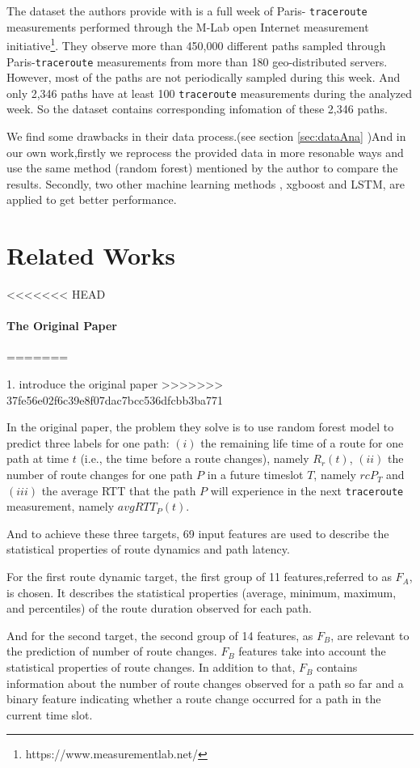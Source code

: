 \documentclass[sigconf]{acmart}
\begin{document}
The dataset the authors provide with is a full week of Paris- \texttt{traceroute} measurements performed through the M-Lab open
Internet measurement initiative\footnote{https://www.measurementlab.net/}. They observe more than 450,000 different paths sampled through Paris-\texttt{traceroute} measurements from more than 180 geo-distributed servers. However, most of the paths are not periodically sampled during this week. And only 2,346 paths have at least 100 \texttt{traceroute} measurements during the analyzed week. So the dataset contains corresponding infomation of these 2,346 paths.

We find some drawbacks in their data process.(see section \ref{sec:dataAna} )And in our own work,firstly we reprocess the provided data in more resonable ways and use the same method (random forest) mentioned by the author to compare the results. Secondly, two other machine learning methods , xgboost and LSTM, are applied to get better performance.
 

\section{Related Works}
<<<<<<< HEAD
 
\paragraph{The Original Paper}
=======

1. introduce the original paper
>>>>>>> 37fe56e02f6c39e8f07dac7bcc536dfcbb3ba771
 
In the original paper, the problem they solve is to use random forest model to predict three labels for one path: $(i)$ the remaining life time of a route for one path at time $t$ (i.e., the time before a route changes), namely $R_r(t)$, $(ii)$ the number of route changes for one path $P$ in a future timeslot $T$, namely $rcP_T$  and $(iii)$ the average RTT that the path $P$ will experience in the next \texttt{traceroute} measurement, namely $avgRTT_P(t)$.

And to achieve these three targets, 69 input features are used to describe the  statistical properties of route dynamics and path latency.
 
For the first route dynamic target, the first group of 11 features,referred to as $F_A$, is chosen. It describes the statistical properties (average, minimum, maximum, and percentiles) of the route duration observed for each path.
 
And for the second target, the second group of 14 features, as $F_B$, are relevant to the prediction of number of route changes. $F_B$ features take into account the statistical properties of route changes. In addition to that, $F_B$ contains information about the number of route changes observed for a path so far and a binary feature indicating whether a route change occurred for a path in the current time slot. 
 
\end{document}
